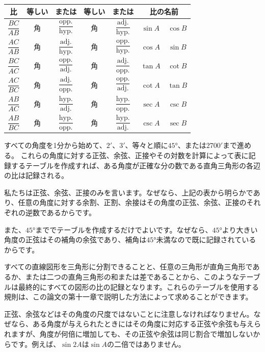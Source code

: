 \documentclass[a4paper,11pt,openany]{ltjsbook}
\begin{document}
\begin{center}
\small
\begin{tabular}{|c|c|c|c|c|cc|}
\hline\hline
比 & 等しい & または & 等しい & または & \multicolumn{2}{c|}{比の名前} \\
\hline
$\dfrac{BC}{AB}$ & 角 & $\dfrac{\text{opp.}}{\text{hyp.}}$ & 角 & $\dfrac{\text{adj.}}{\text{hyp.}}$ & $\sin A$ & $\cos B$ \\
$\dfrac{AC}{AB}$ & 角 & $\dfrac{\text{adj.}}{\text{hyp.}}$ & 角 & $\dfrac{\text{opp.}}{\text{hyp.}}$ & $\cos A$ & $\sin B$ \\
$\dfrac{BC}{AC}$ & 角 & $\dfrac{\text{opp.}}{\text{adj.}}$ & 角 & $\dfrac{\text{adj.}}{\text{opp.}}$ & $\tan A$ & $\cot B$ \\
$\dfrac{AC}{BC}$ & 角 & $\dfrac{\text{adj.}}{\text{opp.}}$ & 角 & $\dfrac{\text{opp.}}{\text{adj.}}$ & $\cot A$ & $\tan B$ \\
$\dfrac{AB}{AC}$ & 角 & $\dfrac{\text{hyp.}}{\text{adj.}}$ & 角 & $\dfrac{\text{hyp.}}{\text{opp.}}$ & $\sec A$ & $\csc B$ \\
$\dfrac{AB}{BC}$ & 角 & $\dfrac{\text{hyp.}}{\text{opp.}}$ & 角 & $\dfrac{\text{hyp.}}{\text{adj.}}$ & $\csc A$ & $\sec B$ \\
\hline\hline
\end{tabular}
\end{center}

すべての角度を1分から始めて、$2'$、$3'$、等々と順に$45°$、または$2700'$まで進める。
これらの角度に対する正弦、余弦、正接やその対数を計算によって表に記録するテーブルを作成すれば、ある角度が正確な分の数である直角三角形の各辺の比は記録される。

私たちは正弦、余弦、正接のみを言います。なぜなら、上記の表から明らかであり、任意の角度に対する余割、正割、余接はその角度の正弦、余弦、正接のそれぞれの逆数であるからです。

また、$45°$まででテーブルを作成するだけでよいです。なぜなら、$45°$より大きい角度の正弦はその補角の余弦であり、補角は$45°$未満なので既に記録されているからです。

すべての直線図形を三角形に分割できることと、任意の三角形が直角三角形であるか、または二つの直角三角形の和または差であることから、このようなテーブルは最終的にすべての図形の比の記録となります。これらのテーブルを使用する規則は、この論文の第十一章で説明した方法によって求めることができます。

正弦、余弦などはその角度の尺度ではないことに注意しなければなりません。なぜなら、ある角度が与えられたときにはその角度に対応する正弦や余弦も与えられますが、角度が何倍に増加しても、その正弦や余弦は同じ割合で増加しないからです。例えば、$\sin 2A$は$\sin A$の二倍ではありません。
\end{document}
